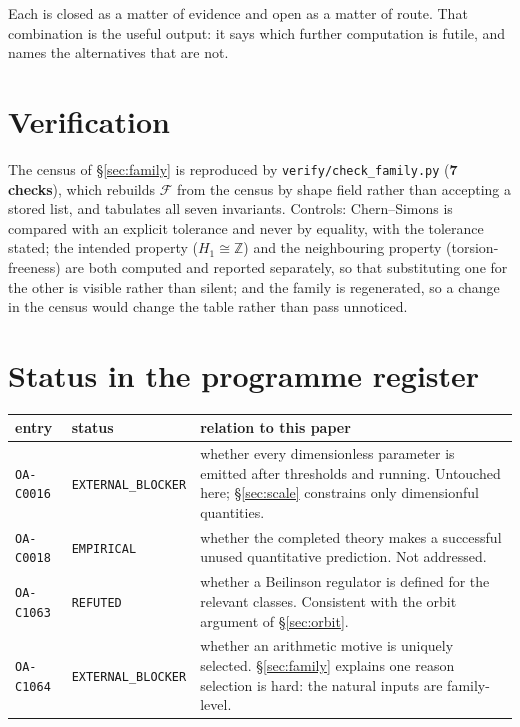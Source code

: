 \documentclass[11pt,a4paper]{article}
\theoremstyle{definition}
\theoremstyle{remark}
\newcommand{\Z}{\mathbb{Z}}
\begin{document}
Each is closed as a matter of evidence and open as a matter of route. That combination is the
useful output: it says which further computation is futile, and names the alternatives that are
not.

\appendix

\section{Verification}\label{app:verify}

The census of \S\ref{sec:family} is reproduced by \texttt{verify/check\_family.py}
(\textbf{7 checks}), which rebuilds $\mathcal{F}$
from the census by shape field rather than accepting a stored list, and tabulates all seven
invariants. Controls: Chern--Simons is compared with an explicit tolerance and never by equality,
with the tolerance stated; the intended property ($H_1\cong\Z$) and the neighbouring property
(torsion-freeness) are both computed and reported separately, so that substituting one for the
other is visible rather than silent; and the family is regenerated, so a change in the census
would change the table rather than pass unnoticed.

\section{Status in the programme register}\label{app:register}

\begin{center}
\begin{tabular}{@{}llp{6.9cm}@{}}
\toprule
entry & status & relation to this paper \\
\midrule
\texttt{OA-C0016} & \texttt{EXTERNAL\_BLOCKER} & whether every dimensionless parameter is emitted after thresholds and running. Untouched here; \S\ref{sec:scale} constrains only dimensionful quantities. \\
\texttt{OA-C0018} & \texttt{EMPIRICAL} & whether the completed theory makes a successful unused quantitative prediction. Not addressed. \\
\texttt{OA-C1063} & \texttt{REFUTED} & whether a Beilinson regulator is defined for the relevant classes. Consistent with the orbit argument of \S\ref{sec:orbit}. \\
\texttt{OA-C1064} & \texttt{EXTERNAL\_BLOCKER} & whether an arithmetic motive is uniquely selected. \S\ref{sec:family} explains one reason selection is hard: the natural inputs are family-level. \\
\bottomrule
\end{tabular}
\end{center}
\end{document}
